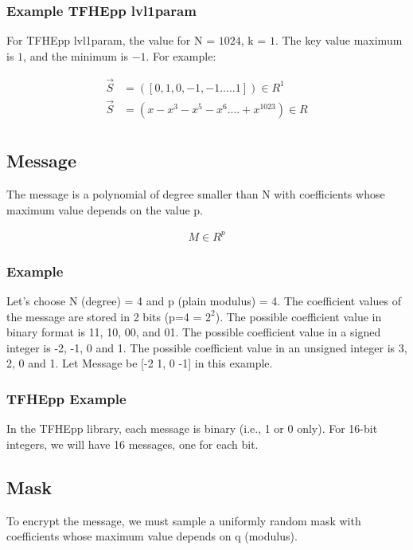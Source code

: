 \documentclass{techrep}
\theoremstyle{definition}
\theoremstyle{plain}
\begin{document}
\subsubsection{Example TFHEpp lvl1param}
For TFHEpp lvl1param, the value for N = $1024$, k = $1$. The key value maximum is $1$, and the minimum is $-1$. For example:

\begin{align*} 
\overrightarrow{S} &= ([0, 1, 0, -1, -1 ..... 1]) \in R^1 \\ 
\overrightarrow{S} &= (x - x^3 - x^5 - x^6 .... + x^{1023}) \in R \\ 
\end{align*}


	\subsection{Message}

The message is a polynomial of degree smaller than N with coefficients whose maximum value depends on the value p.

	\begin{align*}
		M \in R^p
	\end{align*}

\subsubsection{Example}

Let’s choose N (degree) = 4 and p (plain modulus) = 4. The coefficient values of the message are stored in 2 bits (p=4 = $2^2$). The possible coefficient value in binary format is {11, 10, 00, and 01}. The possible coefficient value in a signed integer is {-2, -1, 0 and 1}. The possible coefficient value in an unsigned integer is {3, 2, 0 and 1}. Let Message be [-2 1, 0 -1] in this example.

\subsubsection{TFHEpp Example}
In the TFHEpp library, each message is binary (i.e., 1 or 0 only). For 16-bit integers, we will have 16 messages, one for each bit. 

	\subsection{Mask}
To encrypt the message, we must sample a uniformly random mask with coefficients whose maximum value depends on q (modulus).
\end{document}
